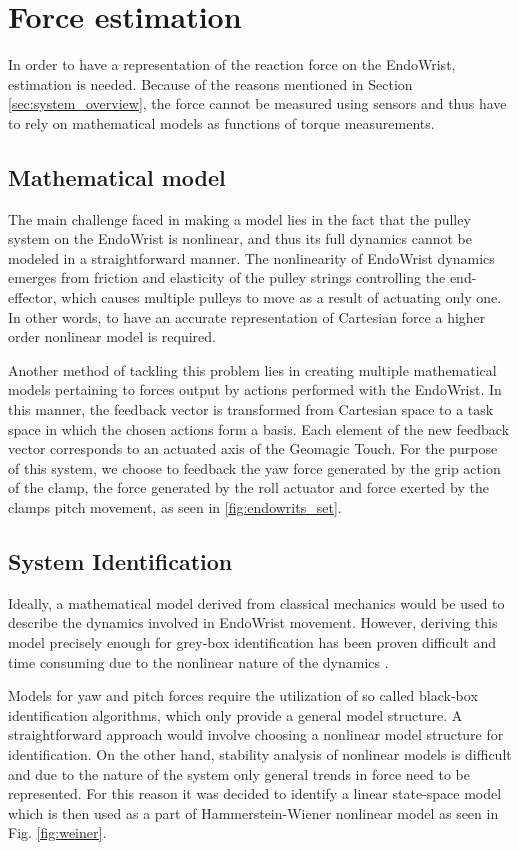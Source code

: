 \section{Force estimation}\label{sec:force_estimation}
In order to have a representation of the reaction force on the EndoWrist, estimation is needed.
Because of the reasons mentioned in Section \ref{sec:system_overview}, the force cannot be measured using sensors and thus have to rely on mathematical models as functions of torque measurements.

\subsection{Mathematical model}
The main challenge faced in making a model lies in the fact that the pulley system on the EndoWrist is nonlinear, and thus its full dynamics cannot be modeled in a straightforward manner. 
The nonlinearity of EndoWrist dynamics emerges from friction and elasticity of the pulley strings controlling the end-effector, which causes multiple pulleys to move as a result of actuating only one. 
In other words, to have an accurate representation of Cartesian force a higher order nonlinear model is required.

Another method of tackling this problem lies in creating multiple mathematical models pertaining to forces output by actions performed with the EndoWrist.
In this manner, the feedback vector is transformed from Cartesian space to a task space in which the chosen actions form a basis.
Each element of the new feedback vector corresponds to an actuated axis of the Geomagic Touch.
For the purpose of this system, we choose to feedback the yaw force generated by the grip action of the clamp, the force generated by the roll actuator and force exerted by the clamps pitch movement, as seen in \ref{fig:endowrits_set}.

\subsection{System Identification}
Ideally, a mathematical model derived from classical mechanics would be used to describe the dynamics involved in EndoWrist movement.
However, deriving this model precisely enough for grey-box identification has been proven difficult and time consuming due to the nonlinear nature of the dynamics \cite{kim2014dynamic}.

Models for yaw and pitch forces require the utilization of so called black-box identification algorithms, which only provide a general model structure. 
A straightforward approach would involve choosing a nonlinear model structure for identification.
On the other hand, stability analysis of nonlinear models is difficult and due to the nature of the system only general trends in force need to be represented.
For this reason it was decided to identify a linear state-space model which is then used as a part of Hammerstein-Wiener  \cite{zhu2002estimation} nonlinear model as seen in Fig. \ref{fig:weiner}.


